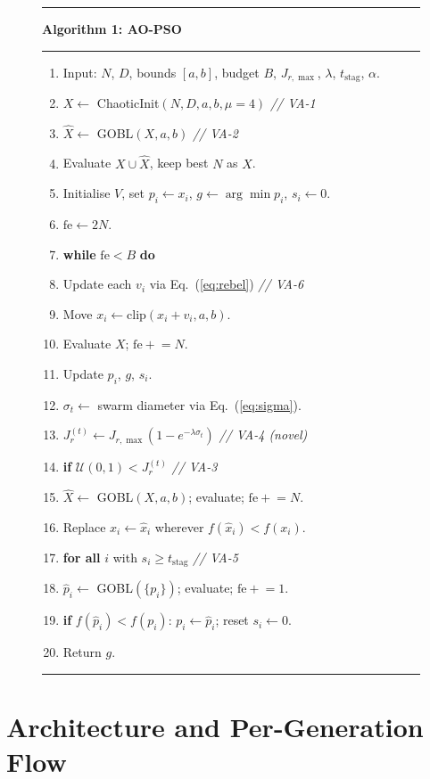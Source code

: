 \documentclass[11pt,a4paper]{article}
\newcommand{\algoname}{AO-PSO}
\newcommand{\jrt}{J_{r}^{(t)}}
\newcommand{\jrmax}{J_{r,\max}}
\newenvironment{aopsoalgo}[1]{%
  \begin{figure}[H]\centering
  \begin{minipage}{0.95\linewidth}
  \rule{\linewidth}{0.6pt}\par\vspace{2pt}
  \textbf{Algorithm 1: #1}\par\vspace{1pt}
  \rule{\linewidth}{0.4pt}\vspace{2pt}
  \begin{enumerate}[leftmargin=2.4em,itemsep=1pt,topsep=0pt,
                    label=\arabic*:]
  \ttfamily\small
}{%
  \end{enumerate}\vspace{-2pt}\rule{\linewidth}{0.4pt}\end{minipage}\end{figure}%
}
\newcommand{\algcomment}[1]{{\normalfont\itshape\color{nutAccent}\quad // #1}}
\begin{document}
\begin{aopsoalgo}{\algoname}
\item Input: $N$, $D$, bounds $[a,b]$, budget $B$, $\jrmax$, $\lambda$, $t_{\text{stag}}$, $\alpha$.
\item $X \leftarrow$ ChaoticInit$(N, D, a, b, \mu=4)$ \algcomment{VA-1}
\item $\hat{X} \leftarrow$ GOBL$(X, a, b)$ \algcomment{VA-2}
\item Evaluate $X \cup \hat{X}$, keep best $N$ as $X$.
\item Initialise $V$, set $p_i \leftarrow x_i$, $g \leftarrow \arg\min p_i$, $s_i \leftarrow 0$.
\item $\mathrm{fe} \leftarrow 2N$.
\item \textbf{while} $\mathrm{fe} < B$ \textbf{do}
\item \quad Update each $v_i$ via Eq.~(\ref{eq:rebel}) \algcomment{VA-6}
\item \quad Move $x_i \leftarrow \mathrm{clip}(x_i + v_i, a, b)$.
\item \quad Evaluate $X$; $\mathrm{fe}\mathrel{+}{=} N$.
\item \quad Update $p_i$, $g$, $s_i$.
\item \quad $\sigma_t \leftarrow$ swarm diameter via Eq.~(\ref{eq:sigma}).
\item \quad $\jrt \leftarrow \jrmax(1 - e^{-\lambda \sigma_t})$ \algcomment{VA-4 (novel)}
\item \quad \textbf{if} $\mathcal{U}(0,1) < \jrt$ \algcomment{VA-3}
\item \quad\quad $\hat{X} \leftarrow$ GOBL$(X,a,b)$; evaluate; $\mathrm{fe}\mathrel{+}{=} N$.
\item \quad\quad Replace $x_i \leftarrow \hat{x}_i$ wherever $f(\hat{x}_i) < f(x_i)$.
\item \quad \textbf{for all} $i$ with $s_i \geq t_{\text{stag}}$ \algcomment{VA-5}
\item \quad\quad $\hat{p}_i \leftarrow$ GOBL$(\{p_i\})$; evaluate; $\mathrm{fe}\mathrel{+}{=} 1$.
\item \quad\quad \textbf{if} $f(\hat{p}_i) < f(p_i)$: $p_i \leftarrow \hat{p}_i$; reset $s_i \leftarrow 0$.
\item Return $g$.
\end{aopsoalgo}


\section{Architecture and Per-Generation Flow}
\end{document}
